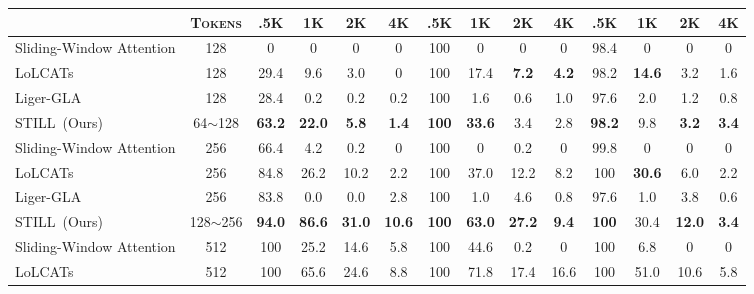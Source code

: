 \begin{table}[ht]
{\begin{tabular}{l|c|cccc|cccc|cccc}
            & \textbf{\textsc{Tokens}}
            & .5K
            & 1K
            & 2K
            & 4K
            & .5K
            & 1K
            & 2K
            & 4K
            & .5K
            & 1K
            & 2K
            & 4K
            \\
            \midrule
            Sliding-Window Attention & 128 & 0 & 0 & 0 & 0 & 100 & 0 & 0 & 0 & 98.4 & 0 & 0 & 0\\
            LoLCATs~\citep{lolcats} & 128 & 29.4 & 9.6 & 3.0 & 0 & 100 & 17.4 & \textbf{7.2} & \textbf{4.2} & 98.2 & \textbf{14.6} & 3.2 & 1.6 \\
            Liger-GLA~\citep{liger} & 128 &  28.4 & 0.2 & 0.2 & 0.2 & 100 & 1.6 & 0.6 & 1.0 & 97.6 & 2.0 & 1.2 & 0.8 \\
            \rowcolor[HTML]{E2ECF9}
            STILL~(Ours) & 64$\sim$128 & \textbf{63.2} & \textbf{22.0} & \textbf{5.8} & \textbf{1.4} & \textbf{100} & \textbf{33.6} & 3.4 & 2.8 & \textbf{98.2} & 9.8 & \textbf{3.2} & \textbf{3.4} \\
            \midrule
            Sliding-Window Attention & 256 & 66.4 & 4.2 & 0.2 & 0 & 100 & 0 & 0.2 & 0 & 99.8 & 0 & 0 & 0  \\
            LoLCATs~\citep{lolcats} & 256 & 84.8 & 26.2 & 10.2 & 2.2 & 100 & 37.0 & 12.2 & 8.2 & 100 & \textbf{30.6} & 6.0 & 2.2 \\
            Liger-GLA~\citep{liger} & 256 & 83.8 & 0.0 &  0.0 & 2.8 & 100 & 1.0 & 4.6 & 0.8 & 97.6 & 1.0 & 3.8 & 0.6 \\
            \rowcolor[HTML]{E2ECF9}
            STILL~(Ours) & 128$\sim$256 & \textbf{94.0} & \textbf{86.6} & \textbf{31.0} & \textbf{10.6} & \textbf{100} & \textbf{63.0} & \textbf{27.2} & \textbf{9.4} & \textbf{100} & 30.4 & \textbf{12.0} & \textbf{3.4} \\
            \midrule
            Sliding-Window Attention & 512 & 100 & 25.2 & 14.6 & 5.8 & 100 & 44.6 & 0.2 & 0 & 100 & 6.8 & 0 & 0 \\
            LoLCATs~\citep{lolcats} & 512 & 100 & 65.6 & 24.6 & 8.8 & 100 & 71.8 & 17.4 & 16.6 & 100 & 51.0 & 10.6 & 5.8 \\

\end{tabular}}
\end{table}
